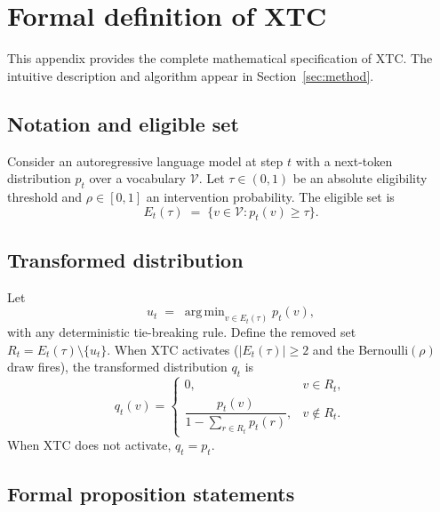 \documentclass{article}
\newcommand{\xtc}{\textsc{XTC}}
\newcommand{\Vocab}{\mathcal{V}}
\newcommand{\pt}{p_t}
\newcommand{\qt}{q_t}
\newcommand{\Et}{E_t(\tau)}
\newcommand{\Rt}{R_t}
\DeclareMathOperator*{\argminprob}{arg\,min}
\begin{document}



\newpage
\appendix

\section{Formal definition of \xtc{}}
\label{app:formal}

This appendix provides the complete mathematical specification of \xtc{}.
The intuitive description and algorithm appear in Section~\ref{sec:method}.

\subsection{Notation and eligible set}

Consider an autoregressive language model at step $t$ with a next-token distribution $\pt$ over a vocabulary $\Vocab$.
Let $\tau \in (0,1)$ be an absolute eligibility threshold and $\rho \in [0,1]$ an intervention probability.
The eligible set is
\begin{equation}
\Et \;=\; \{v \in \Vocab : \pt(v) \ge \tau\}.
\end{equation}

\subsection{Transformed distribution}

Let
\begin{equation}
u_t \;=\; \argminprob_{v \in \Et} \pt(v),
\end{equation}
with any deterministic tie-breaking rule.
Define the removed set $\Rt = \Et \setminus \{u_t\}$.
When \xtc{} activates ($|\Et| \ge 2$ and the Bernoulli$(\rho)$ draw fires), the transformed distribution $\qt$ is
\begin{equation}
\label{eq:xtc}
\qt(v) =
\begin{cases}
0, & v \in \Rt,\\[4pt]
\dfrac{\pt(v)}{1 - \sum_{r \in \Rt} \pt(r)}, & v \notin \Rt.
\end{cases}
\end{equation}
When \xtc{} does not activate, $\qt = \pt$.

\subsection{Formal proposition statements}
\end{document}
